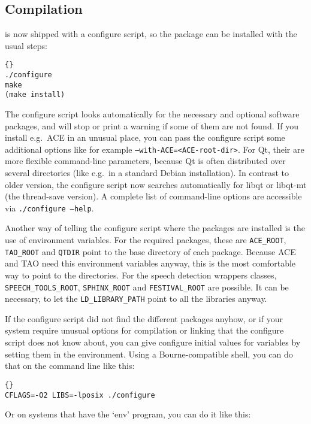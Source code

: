 \subsection{Compilation}

\miro is now shipped with a configure script, so the package can be
installed with the usual steps:

\begin{lstlisting}[frame=tb]{}
./configure
make 
(make install)
\end{lstlisting}

The configure script looks automatically for the necessary and
optional software packages, and will stop or print a warning if some
of them are not found. If you install e.g.\ ACE in an unusual place,
you can pass the configure script some additional options like for
example \texttt{--with-ACE=<ACE-root-dir>}. For Qt, their are more
flexible command-line parameters, because Qt is often distributed over
several directories (like e.g.\ in a standard Debian installation).
In contrast to older version, the configure script now searches
automatically for libqt or libqt-mt (the thread-save version).
A complete list of command-line options are accessible via
\texttt{./configure --help}.

Another way of telling the configure script where the packages are
installed is the use of environment variables. For the required
packages, these are \texttt{ACE\_ROOT}, \texttt{TAO\_ROOT} and
\texttt{QTDIR} point to the base directory of each package. Because
ACE and TAO need this environment variables anyway, this is the most
comfortable way to point to the directories. For the speech detection
wrappers classes, \texttt{SPEECH\_TOOLS\_ROOT}, \texttt{SPHINX\_ROOT}
and \texttt{FESTIVAL\_ROOT} are possible. It can be necessary, to let
the \texttt{LD\_LIBRARY\_PATH} point to all the libraries anyway.

If the configure script did not find the different packages anyhow, or
if your system require unusual options for compilation or linking that
the configure script does not know about, you can give configure
initial values for variables by setting them in the environment. Using
a Bourne-compatible shell, you can do that on the command line like
this:

\begin{lstlisting}[frame=tb]{}
CFLAGS=-O2 LIBS=-lposix ./configure
\end{lstlisting}

Or on systems that have the `env' program, you can do it like this:

